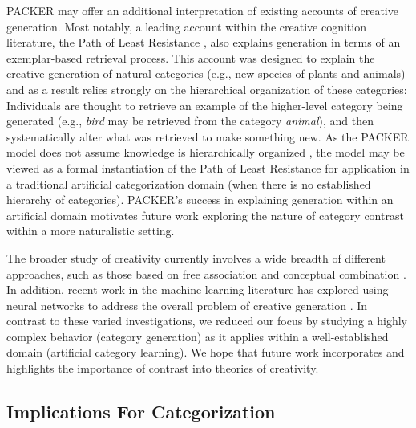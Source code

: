 \documentclass[12pt]{article}
\begin{document}
\begin{flushleft}
PACKER may offer an additional interpretation of existing accounts of creative
generation. Most notably, a leading account within the creative cognition
literature, the Path of Least Resistance \citep{ward1994structured,ward1995s},
also explains generation in terms of an exemplar-based retrieval process. This
account was designed to explain the creative generation of natural categories
(e.g., new species of plants and animals) and as a result relies strongly on the
hierarchical organization of these categories: Individuals are thought to
retrieve an example of the higher-level category being generated (e.g.,
\textit{bird} may be retrieved from the category \textit{animal}), and then
systematically alter what was retrieved to make something new. As the PACKER
model does not assume knowledge is hierarchically organized \citep[this is true
of the exemplar view more broadly, see][]{murphy2016exemplar}, the model may be
viewed as a formal instantiation of the Path of Least Resistance for application
in a traditional artificial categorization domain (when there is no established
hierarchy of categories). PACKER's success in explaining generation within an
artificial domain motivates future work exploring the nature of category
contrast within a more naturalistic setting.

The broader study of creativity currently involves a wide breadth of different
approaches\citep[for a review see][]{kozbelt2010theories}, such as those based
on free association \citep{mednick1962associative} and conceptual combination
\citep{estes2002emergence,murphy1988comprehending}. In addition, recent work in
the machine learning literature has explored using neural networks to address
the overall problem of creative generation
\citep[e.g.,][]{goodfellow2014gan,ho2016gail,kingma2016,chen2016infogan}. In
contrast to these varied investigations, we reduced our focus by studying a
highly complex behavior (category generation) as it applies within a
well-established domain (artificial category learning). We hope that future work
incorporates and highlights the importance of contrast into theories of
creativity.

\subsection{Implications For Categorization}


\end{flushleft}
\end{document}
